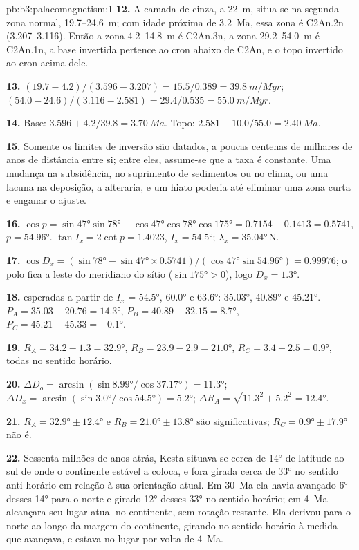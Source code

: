 \begin{solution}{pb:b3:palaeomagnetism:1}
\textbf{12.} A camada de cinza, a \qty{22}{m}, situa-se na segunda zona normal,
19.7--\qty{24.6}{m}; com idade próxima de \qty{3.2}{Ma}, essa zona é C2An.2n
(3.207--3.116). Então a zona 4.2--\qty{14.8}{m} é C2An.3n, a zona
29.2--\qty{54.0}{m} é C2An.1n, a base invertida pertence ao cron abaixo de
C2An, e o topo invertido ao cron acima dele.

\textbf{13.} $(19.7 - 4.2)/(3.596 - 3.207) = 15.5/0.389 = \qty{39.8}{m/Myr}$;
$(54.0 - 24.6)/(3.116 - 2.581) = 29.4/0.535 = \qty{55.0}{m/Myr}$.

\textbf{14.} Base: $3.596 + 4.2/39.8 = \qty{3.70}{Ma}$. Topo: $2.581 -
10.0/55.0 = \qty{2.40}{Ma}$.

\textbf{15.} Somente os limites de inversão são datados, a poucas centenas de milhares de anos
de distância entre si; entre eles, assume-se que a taxa é constante. Uma mudança na subsidência, no
suprimento de sedimentos ou no clima, ou uma lacuna na deposição, a alteraria, e um
hiato poderia até eliminar uma zona curta e enganar o ajuste.

\textbf{16.} $\cos p = \sin\ang{47}\sin\ang{78} + \cos\ang{47}\cos\ang{78}
\cos\ang{175} = 0.7154 - 0.1413 = 0.5741$, $p = \ang{54.96}$. $\tan I_x =
2\cot p = 1.4023$, $I_x = \ang{54.5}$; $\lambda_x = \ang{35.04}$\,N.

\textbf{17.} $\cos D_x = (\sin\ang{78} - \sin\ang{47}\times0.5741)/
(\cos\ang{47}\sin\ang{54.96}) = 0.99976$; o polo fica a leste do meridiano do
sítio ($\sin\ang{175} > 0$), logo $D_x = \ang{1.3}$.

\textbf{18.}  esperadas a partir de $I_x$ = \ang{54.5}, \ang{60.0} e
\ang{63.6}: \ang{35.03}, \ang{40.89} e \ang{45.21}. $P_A = 35.03 - 20.76 =
\ang{14.3}$, $P_B = 40.89 - 32.15 = \ang{8.7}$, $P_C = 45.21 - 45.33 =
\ang{-0.1}$.

\textbf{19.} $R_A = 34.2 - 1.3 = \ang{32.9}$, $R_B = 23.9 - 2.9 = \ang{21.0}$,
$R_C = 3.4 - 2.5 = \ang{0.9}$, todas no sentido horário.

\textbf{20.} $\Delta D_o = \arcsin(\sin\ang{8.99}/\cos\ang{37.17}) = \ang{11.3}$;
$\Delta D_x = \arcsin(\sin\ang{3.0}/\cos\ang{54.5}) = \ang{5.2}$; $\Delta R_A =
\sqrt{11.3^2 + 5.2^2} = \ang{12.4}$.

\textbf{21.} $R_A = \ang{32.9} \pm \ang{12.4}$ e $R_B = \ang{21.0} \pm
\ang{13.8}$ são significativas; $R_C = \ang{0.9} \pm \ang{17.9}$ não é.

\textbf{22.} Sessenta milhões de anos atrás, Kesta situava-se cerca de \ang{14} de latitude
ao sul de onde o continente estável a coloca, e fora girada cerca de \ang{33}
no sentido anti-horário em relação à sua orientação atual. Em \qty{30}{Ma} ela havia avançado
\ang{6} desses \ang{14} para o norte e girado \ang{12} desses \ang{33}
no sentido horário; em \qty{4}{Ma} alcançara seu lugar atual no continente,
sem rotação restante. Ela derivou para o norte ao longo da margem do continente, girando
no sentido horário à medida que avançava, e estava no lugar por volta de \qty{4}{Ma}.


\end{solution}
